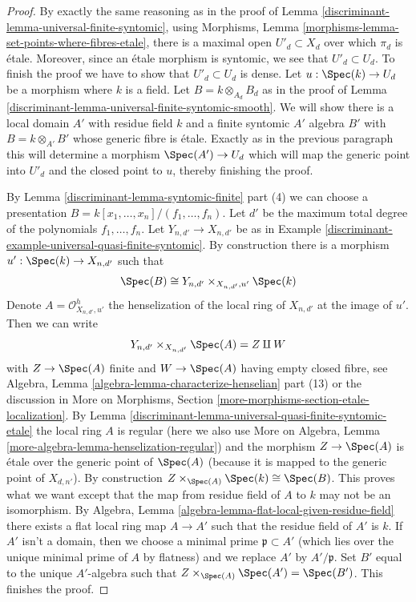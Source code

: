 \begin{proof}

By exactly the same reasoning as in the proof of
Lemma \ref{discriminant-lemma-universal-finite-syntomic}, using
Morphisms, Lemma \ref{morphisms-lemma-set-points-where-fibres-etale},
there is a maximal open $U'_d \subset X_d$ over which $\pi_d$ is
\'etale. Moreover, since an \'etale morphism is syntomic, we see
that $U'_d \subset U_d$. To finish the proof we have to show
that $U'_d \subset U_d$ is dense. Let $u : \Spec(k) \to U_d$ be a morphism
where $k$ is a field. Let $B = k \otimes_{A_d} B_d$ as in the
proof of Lemma \ref{discriminant-lemma-universal-finite-syntomic-smooth}.
We will show there is a local domain $A'$ with residue field $k$
and a finite syntomic $A'$ algebra $B'$ with $B = k \otimes_{A'} B'$
whose generic fibre is \'etale. Exactly as in the previous paragraph
this will determine a morphism $\Spec(A') \to U_d$ which will map the
generic point into $U'_d$ and the closed point to $u$, thereby
finishing the proof.

\medskip\noindent
By Lemma \ref{discriminant-lemma-syntomic-finite} part (4) we can choose a presentation
$B = k[x_1, \ldots, x_n]/(f_1, \ldots, f_n)$.
Let $d'$ be the maximum total degree of the polynomials $f_1, \ldots, f_n$.
Let $Y_{n, d'} \to X_{n, d'}$ be as in
Example \ref{discriminant-example-universal-quasi-finite-syntomic}.
By construction there is a morphism $u' : \Spec(k) \to X_{n, d'}$
such that
$$
\Spec(B) \cong Y_{n, d'} \times_{X_{n, d'}, u'} \Spec(k)
$$
Denote $A = \mathcal{O}_{X_{n, d'}, u'}^h$ the henselization of the
local ring of $X_{n, d'}$ at the image of $u'$. Then we can write
$$
Y_{n, d'} \times_{X_{n, d'}} \Spec(A) = Z \amalg W
$$
with $Z \to \Spec(A)$ finite and $W \to \Spec(A)$ having empty
closed fibre, see
Algebra, Lemma \ref{algebra-lemma-characterize-henselian} part (13)
or the discussion in More on Morphisms, Section
\ref{more-morphisms-section-etale-localization}.
By Lemma \ref{discriminant-lemma-universal-quasi-finite-syntomic-etale}
the local ring $A$ is regular (here we also use
More on Algebra, Lemma \ref{more-algebra-lemma-henselization-regular})
and the morphism $Z \to \Spec(A)$ is \'etale over the generic point of
$\Spec(A)$ (because it is mapped to the generic point of $X_{d, n'}$).
By construction $Z \times_{\Spec(A)} \Spec(k) \cong \Spec(B)$.
This proves what we want except that the map from
residue field of $A$ to $k$ may not be an isomorphism.
By Algebra, Lemma \ref{algebra-lemma-flat-local-given-residue-field}
there exists a flat local ring map $A \to A'$ such that the residue
field of $A'$ is $k$. If $A'$ isn't a domain, then we choose a
minimal prime $\mathfrak p \subset A'$ (which lies over the
unique minimal prime of $A$ by flatness) and we replace
$A'$ by $A'/\mathfrak p$. Set $B'$ equal to the unique $A'$-algebra
such that $Z \times_{\Spec(A)} \Spec(A') = \Spec(B')$.
This finishes the proof.
\end{proof}

